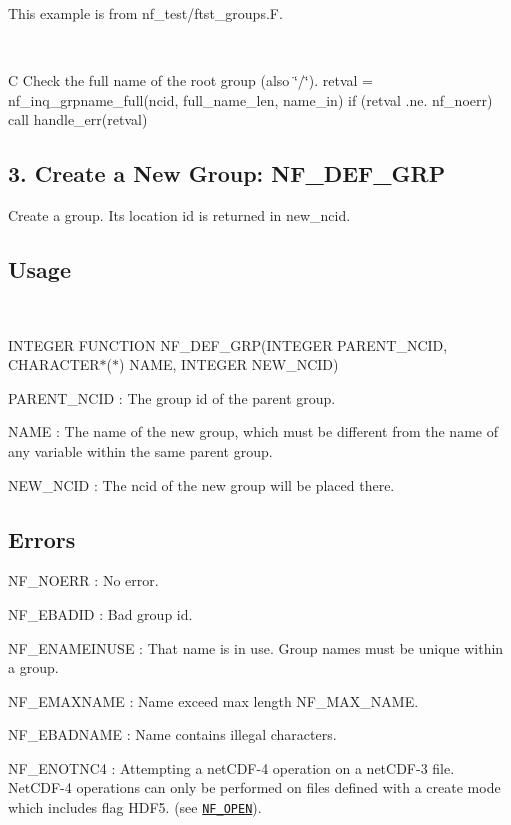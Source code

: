 This example is from nf\+\_\+test/ftst\+\_\+groups.\+F.

 

C Check the full name of the root group (also \char`\"{}/\char`\"{}). retval = nf\+\_\+inq\+\_\+grpname\+\_\+full(ncid, full\+\_\+name\+\_\+len, name\+\_\+in) if (retval .ne. nf\+\_\+noerr) call handle\+\_\+err(retval)\hypertarget{nc_f77_interface_guide_f77_NF-DEF-GRP}{}\subsection{3. Create a New Group\+: N\+F\+\_\+\+D\+E\+F\+\_\+\+G\+R\+P }\label{nc_f77_interface_guide_f77_NF-DEF-GRP}
Create a group. Its location id is returned in new\+\_\+ncid.

\subsection*{Usage }

 

I\+N\+T\+E\+G\+ER F\+U\+N\+C\+T\+I\+ON N\+F\+\_\+\+D\+E\+F\+\_\+\+G\+RP(I\+N\+T\+E\+G\+ER P\+A\+R\+E\+N\+T\+\_\+\+N\+C\+ID, C\+H\+A\+R\+A\+C\+T\+E\+R$\ast$($\ast$) N\+A\+ME, I\+N\+T\+E\+G\+ER N\+E\+W\+\_\+\+N\+C\+ID)

{\ttfamily P\+A\+R\+E\+N\+T\+\_\+\+N\+C\+ID} \+: The group id of the parent group.

{\ttfamily N\+A\+ME} \+: The name of the new group, which must be different from the name of any variable within the same parent group.

{\ttfamily N\+E\+W\+\_\+\+N\+C\+ID} \+: The ncid of the new group will be placed there.

\subsection*{Errors }

{\ttfamily N\+F\+\_\+\+N\+O\+E\+RR} \+: No error.

{\ttfamily N\+F\+\_\+\+E\+B\+A\+D\+ID} \+: Bad group id.

{\ttfamily N\+F\+\_\+\+E\+N\+A\+M\+E\+I\+N\+U\+SE} \+: That name is in use. Group names must be unique within a group.

{\ttfamily N\+F\+\_\+\+E\+M\+A\+X\+N\+A\+ME} \+: Name exceed max length N\+F\+\_\+\+M\+A\+X\+\_\+\+N\+A\+ME.

{\ttfamily N\+F\+\_\+\+E\+B\+A\+D\+N\+A\+ME} \+: Name contains illegal characters.

{\ttfamily N\+F\+\_\+\+E\+N\+O\+T\+N\+C4} \+: Attempting a net\+C\+D\+F-\/4 operation on a net\+C\+D\+F-\/3 file. Net\+C\+D\+F-\/4 operations can only be performed on files defined with a create mode which includes flag H\+D\+F5. (see \href{#NF_005fOPEN}{\tt N\+F\+\_\+\+O\+P\+EN}).

